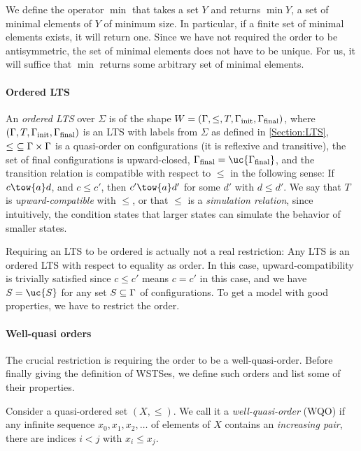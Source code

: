 \documentclass[../../diss.tex]{subfiles}
\begin{document}
We define the operator $\min$ that takes a set $Y$ and returns $\min Y$, a set of minimal elements of $Y$ of minimum size.
In particular, if a finite set of minimal elements exists, it will return one.
Since we have not required the order to be antisymmetric, the set of minimal elements does not have to be unique.
For us, it will suffice that $\min$ returns some arbitrary set of minimal elements.

\paragraph{Ordered LTS}

An \emph{ordered LTS} over $\Sigma$ is of the shape $W = (\Gamma,\leq,T,\Gamma_{\text{init}}, \Gamma_{\text{final}})$, where $(\Gamma,T,\Gamma_{\text{init}}, \Gamma_{\text{final}})$ is an LTS with labels from $\Sigma$ as defined in \cref{Section:LTS}, $\leq \ \subseteq \Gamma \times \Gamma$ is a quasi-order on configurations (\ie it is reflexive and transitive), the set of final configurations is upward-closed, \ie $\configs_\final = \uc{\configs_\final}$, and the transition relation is compatible with respect to $\leq$ in the following sense:
If $c \tow{a} d$, and $c \leq c'$, then $c' \tow{a} d'$ for some $d'$ with $d \leq d'$.
We say that $T$ is \emph{upward-compatible} with $\leq$, or that $\leq$ is a \emph{simulation relation}, since intuitively, the condition states that larger states can simulate the behavior of smaller states.

Requiring an LTS to be ordered is actually not a real restriction: Any LTS is an ordered LTS with respect to equality as order.
In this case, upward-compatibility is trivially satisfied since $c \leq c'$ means $c = c'$ in this case, and we have $S = \uc{S}$ for any set $S \subseteq \Gamma$ of configurations.
To get a model with good properties, we have to restrict the order.

\paragraph{Well-quasi orders}

The crucial restriction is requiring the order to be a well-quasi-order.
Before finally giving the definition of WSTSes, we define such orders and list some of their properties.

Consider a quasi-ordered set $(X,\leq)$.
We call it a \emph{well-quasi-order} (WQO) if any infinite sequence $x_0, x_1, x_2, \ldots$ of elements of $X$ contains an \emph{increasing pair}, \ie there are indices $i < j$ with $x_i \leq x_j$.
\end{document}
